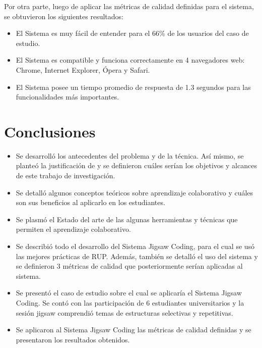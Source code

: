 \documentclass[twoside]{article}
\begin{document}
\begin{multicols}{2}
Por otra parte, luego de aplicar las métricas de calidad definidas para el sistema, se obtuvieron los siguientes resultados:

\begin{itemize}
	\item El Sistema es muy fácil de entender para el 66\% de los usuarios del caso de estudio.
	\item El Sistema es compatible y funciona correctamente en 4 navegadores web: Chrome, Internet Explorer, Ópera y Safari.
	\item El Sistema posee un tiempo promedio de respuesta de 1.3 segundos para las funcionalidades más importantes.
\end{itemize}

\section{Conclusiones}
\begin{itemize}
	\item Se desarrolló los antecedentes del problema y de la técnica. Así mismo, se planteó la justificación de y se definieron cuáles serían los objetivos y alcances de este trabajo de investigación.
	\item Se detalló algunos conceptos teóricos sobre aprendizaje colaborativo y cuáles son sus beneficios al aplicarlo en los estudiantes.
	\item Se plasmó el Estado del arte de las algunas herramientas y técnicas que permiten el aprendizaje colaborativo. 
	\item Se describió todo el desarrollo del Sistema Jigsaw Coding, para el cual se usó las mejores prácticas de RUP. Además, también se detalló el uso del sistema y se definieron 3 métricas de calidad que posteriormente serían aplicadas al sistema.
	\item Se presentó el caso de estudio sobre el cual se aplicaría el Sistema Jigsaw Coding. Se contó con las participación de 6 estudiantes universitarios y la sesión jigsaw comprendió temas de estructuras selectivas y repetitivas.
	\item Se aplicaron al Sistema Jigsaw Coding las métricas de calidad definidas y se presentaron los resultados obtenidos.
\end{itemize}



%
% 


\end{multicols}
\end{document}
